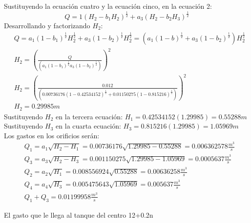     Sustituyendo la ecuación cuatro y la ecuación cinco, en la ecuación 2:
    \begin{equation*}
        Q = 1\left(H_2 - b_1 H_2\right)^{\frac{1}{2}} + a_3\left(H_2 - b_2H_3\right)^{\frac{1}{2}}
    \end{equation*}
    Desarrollando y factorizando $H_2$:
    \begin{align*}
        &Q = a_1\left(1 - b_1\right)^{\frac{1}{2}}H_2^{\frac{1}{2}} + a_3\left(1 - b_2\right)^{\frac{1}{2}}H_2^{\frac{1}{2}} =\left(a_1\left(1 - b\right)^{\frac{1}{2}} + a_3\left(1 - b_2\right)^{\frac{1}{2}}\right)H_2^{\frac{1}{2}}\\
        &H_2 =\left(\frac{Q}{\left(a_1\left(1 - b_1\right)^{\frac{1}{2}} a_3\left(1 - b_2\right)^{\frac{1}{2}}\right)}\right)^2\\
        &H_2 =\left(\frac{0.012}{\left(0.00736176\left(1 - 0.42534152\right)^{\frac{1}{2}} + 0.01150275\left(1 - 0.815216\right)^{\frac{1}{2}}\right)}\right)^2\\
        &H_2 =0.29985m
    \end{align*}
    Sustituyendo $H_2$ en la tercera ecuación: $H_1=0.42534152(1.29985)=0.55288m$
    Sustituyendo $H_3$ en la cuarta ecuación: $H_3=0.815216(1.29985)=1.05969m$
    Los gastos en los orificios serán:
    \begin{align*}
        &Q_1 = a_1 \sqrt{H_2 - H_1} =0.00736176 \sqrt{1.29985 -0.55288} =0.006362578 \frac{m^3}{s}\\ 
        &Q_3 = a_3 \sqrt{H_2 - H_3} =0.001150275 \sqrt{1.29985 -1.05969} =0.0005637 \frac{m^3}{s}\\
        &Q_2 = a_2 \sqrt{H_1} = 0.008556924 \sqrt{0.55288} = 0.00636258 \frac{m^3}{s}\\
        &Q_4 = a_4 \sqrt{H_3} = 0.005475643 \sqrt{1.05969} = 0.005637 \frac{m^3}{s}\\
        &Q_1 + Q_3 = 0.01199958 \frac{m^3}{s}
    \end{align*}
    
    \begin{problem}[¿Qué diámetro debe tener el orificio cuatro para que $Q_2=Q_4$?]
        El gasto que le llega al tanque del centro 12+0.2n
    \end{problem}

